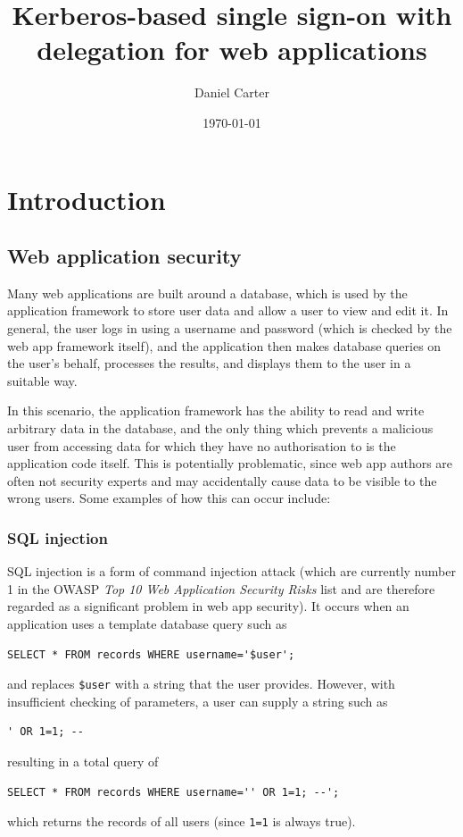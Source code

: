\documentclass{report}
\title{Kerberos-based single sign-on with delegation for web applications}
\author{Daniel Carter}
\date {\today}
\begin{document}
\maketitle

\tableofcontents

\chapter{Introduction}

\section{Web application security}
\label{sec:web_application_security}
Many web applications are built around a database, which is used by the application framework to store user data and allow a user to view and edit it. In general, the user logs in using a username and password (which is checked by the web app framework itself), and the application then makes database queries on the user's behalf, processes the results, and displays them to the user in a suitable way.

In this scenario, the application framework has the ability to read and write arbitrary data in the database, and the only thing which prevents a malicious user from accessing data for which they have no authorisation to is the application code itself. This is potentially problematic, since web app authors are often not security experts and may accidentally cause data to be visible to the wrong users. Some examples of how this can occur include:

\subsection{SQL injection}
\label{sec:sql_injection}
SQL injection is a form of command injection attack (which are currently number 1 in the OWASP \textit{Top 10 Web Application Security Risks} list\cite{OWASP10} and are therefore regarded as a significant problem in web app security). It occurs when an application uses a template database query such as
\begin{verbatim}
SELECT * FROM records WHERE username='$user';
\end{verbatim}
and replaces \verb+$user+ with a string that the user provides. However, with insufficient checking of parameters, a user can supply a string such as
\begin{verbatim}
' OR 1=1; --
\end{verbatim}
resulting in a total query of
\begin{verbatim}
SELECT * FROM records WHERE username='' OR 1=1; --';
\end{verbatim}
which returns the records of all users (since \verb+1=1+ is always true).
\end{document}
